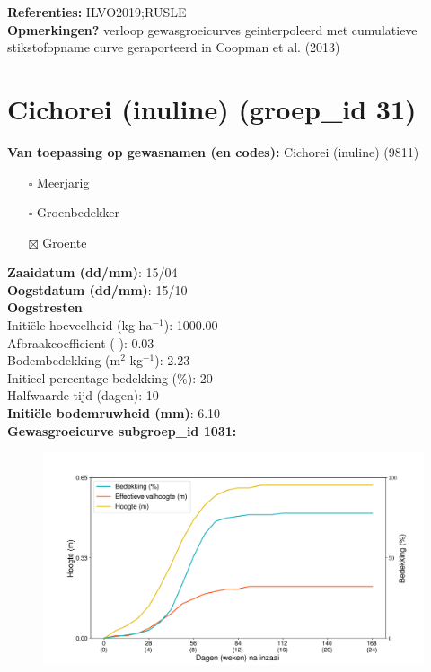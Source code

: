 \documentclass{article}
\begin{document}
  \textbf{Referenties:} ILVO2019;RUSLE \vspace{0.10cm} \\ 
  \textbf{Opmerkingen?} verloop gewasgroeicurves geinterpoleerd met cumulatieve stikstofopname curve geraporteerd in Coopman et al. (2013) \vspace{0.10cm} \\ 
 \newpage 
 \section{Cichorei (inuline) (groep\_id 31)} 
 \textbf{Van toepassing op gewasnamen (en codes):} Cichorei (inuline) (9811) 
 \begin{multicols}{3} \begin{itemize} \item[$\square$] Meerjarig \item[$\square$] Groenbedekker \item[$\boxtimes$] Groente \end{itemize} \end{multicols} 
  \textbf{Zaaidatum (dd/mm)}: 15/04  \vspace{0.10cm} \\ 
  \textbf{Oogstdatum (dd/mm)}: 15/10  \vspace{0.10cm} \\ 
  \textbf{Oogstresten} \vspace{0.05cm} \\ 
  \tab Initi\"{e}le hoeveelheid (kg ha$^{-1}$): 1000.00 \vspace{0.05cm} \\ 
  \tab Afbraakcoefficient (-): 0.03 \vspace{0.05cm} \\ 
  \tab Bodembedekking (m$^2$ kg$^{-1}$): 2.23 \vspace{0.05cm} \\ 
  \tab Initieel percentage bedekking (\%): 20 \vspace{0.05cm} \\ 
  \tab Halfwaarde tijd (dagen): 10 \vspace{0.05cm} \\ 
  \textbf{Initi\"{e}le bodemruwheid (mm)}: 6.10 \vspace{0.05cm} \\ 
  \textbf{Gewasgroeicurve subgroep\_id 1031:} 
 \begin{center} \begin{figure}[H] \includegraphics[width=12.5cm]{temp/1031.png} \end{figure} \end{center} 
\end{document}
